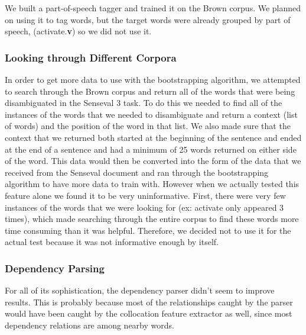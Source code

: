 \documentclass{article}
\begin{document}
We built a part-of-speech tagger and trained it on the Brown corpus. We planned
on using it to tag words, but the target words were already grouped by part of
speech, (activate.\textbf{v}) so we did not use it.



\subsubsection{Looking through Different Corpora}

In order to get more data to use with the bootstrapping algorithm, we attempted
to search through the Brown corpus and return all of the words that were being
disambiguated in the Senseval 3 task.  To do this we needed to find all of the
instances of the words that we needed to disambiguate and return a context
(list of words) and the position of the word in that list.  We also made sure
that the context that we returned both started at the beginning of the
sentence and ended at the end of a sentence and had a minimum of 25 words
returned on either side of the word.  This data would then be converted into
the form of the data that we received from the Senseval document and ran
through the bootstrapping algorithm to have more data to train with.  However
when we actually tested this feature alone we found it to be very
uninformative.  First, there were very few instances of the words that we were
looking for (ex: activate only appeared 3 times), which made searching through
the entire corpus to find these words more time consuming than it was helpful.
Therefore, we decided not to use it for the actual test because it was not
informative enough by itself.


\subsubsection{Dependency Parsing}

For all of its sophistication, the dependency parser didn't seem to improve
results.  This is probably because most of the relationships caught by the
parser would have been caught by the collocation feature extractor as well,
since most dependency relations are among nearby words.
\end{document}
